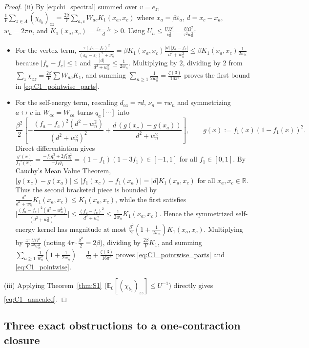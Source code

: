 \documentclass[11pt]{article}
\theoremstyle{definition}
\theoremstyle{remark}
\newcommand{\E}{\mathbb{E}}
\newcommand{\R}{\mathbb{R}}
\begin{document}
\begin{proof}
(ii) By \eqref{eq:chi_spectral} summed over $v = e_z$, $\frac{1}{V}\sum_{z\in\Lambda} (\chi_{b_0})_{zz} = \frac{2\beta}{V} \sum_{a,c} W_{ac} K_1(x_a, x_c)$ where $x_a = \beta\varepsilon_a$, $d = x_c - x_a$, $w_n = 2\pi n$, and $K_1(x_a, x_c) = \frac{f_a - f_c}{d} > 0$. Using $U_n \le \frac{U\Omega^2}{\nu_n^2} = \frac{U\Omega^2}{\tau^2 w_n^2}$:
\begin{itemize}[leftmargin=1.8em]
\item For the vertex term, $\frac{\tau (f_a - f_c)^2}{(\varepsilon_a - \varepsilon_c)^2 + \nu_n^2} = \beta K_1(x_a, x_c) \frac{|d|\,|f_a - f_c|}{d^2 + w_n^2} \le \beta K_1(x_a, x_c) \frac{1}{2w_n}$ because $|f_a - f_c| \le 1$ and $\frac{|d|}{d^2 + w_n^2} \le \frac{1}{2w_n}$. Multiplying by $2$, dividing by $2$ from $\sum_z \chi_{zz} = \frac{2\beta}{V}\sum W_{ac} K_1$, and summing $\sum_{n\ge 1} \frac{1}{2w_n^3} = \frac{\zeta(3)}{16\pi^3}$ proves the first bound in \eqref{eq:C1_pointwise_parts}.
\item For the self-energy term, rescaling $d_{ca} = \tau d$, $\nu_n = \tau w_n$ and symmetrizing $a \leftrightarrow c$ in $W_{ac} = W_{ca}$ turns $q_a [\cdots]$ into
\[
\frac{\beta^2}{2}\left[-\frac{(f_a - f_c)^2 (d^2 - w_n^2)}{(d^2 + w_n^2)^2} + \frac{d\,(g(x_c) - g(x_a))}{d^2 + w_n^2}\right], \qquad g(x) := f_1(x)(1 - f_1(x))^2.
\]
Direct differentiation gives $\frac{g'(x)}{f_1'(x)} = \frac{-f_1 q_1^3 + 2 f_1^2 q_1^2}{-f_1 q_1} = (1 - f_1)(1 - 3f_1) \in [-1, 1]$ for all $f_1 \in [0, 1]$. By Cauchy's Mean Value Theorem, $|g(x_c) - g(x_a)| \le |f_1(x_c) - f_1(x_a)| = |d| K_1(x_a, x_c)$ for all $x_a, x_c \in \R$. Thus the second bracketed piece is bounded by $\frac{d^2}{d^2 + w_n^2} K_1(x_a, x_c) \le K_1(x_a, x_c)$, while the first satisfies $\bigl|\frac{(f_a-f_c)^2(d^2-w_n^2)}{(d^2+w_n^2)^2}\bigr| \le \frac{(f_a-f_c)^2}{d^2+w_n^2} \le \frac{1}{2w_n} K_1(x_a, x_c)$. Hence the symmetrized self-energy kernel has magnitude at most $\frac{\beta^2}{2}(1 + \frac{1}{2w_n}) K_1(x_a, x_c)$. Multiplying by $\frac{4\tau}{V} \frac{U\Omega^2}{\tau^2 w_n^2}$ (noting $4\tau \cdot \frac{\beta^2}{2} = 2\beta$), dividing by $\frac{2\beta}{V} K_1$, and summing $\sum_{n\ge 1} \frac{1}{w_n^2}(1 + \frac{1}{2w_n}) = \frac{1}{24} + \frac{\zeta(3)}{16\pi^3}$ proves \eqref{eq:C1_pointwise_parts} and \eqref{eq:C1_pointwise}.
\end{itemize}
(iii) Applying Theorem~\ref{thm:S1} ($\E_0[(\chi_{b_0})_{zz}] \le U^{-1}$) directly gives \eqref{eq:C1_annealed}.
\end{proof}

\subsection{Three exact obstructions to a one-contraction closure}
\end{document}
